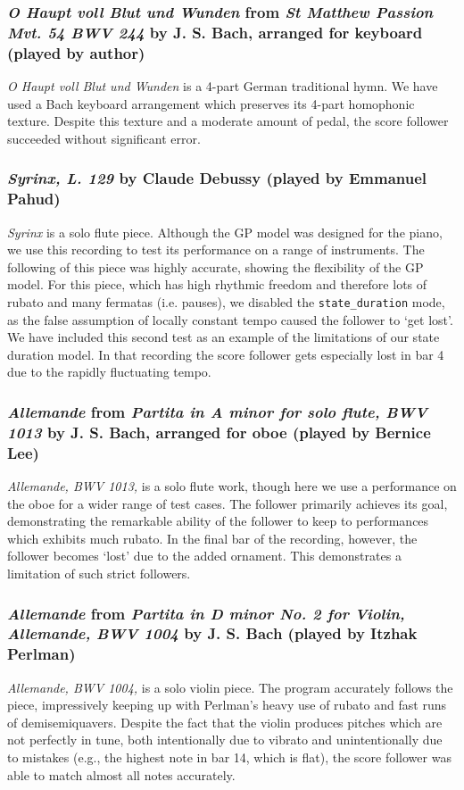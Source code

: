 \subsubsection{\textit{O Haupt voll Blut und Wunden} from \textit{St Matthew Passion Mvt. 54 BWV 244} by J. S. Bach, arranged for keyboard (played by author)}
\textit{O Haupt voll Blut und Wunden} is a 4-part German traditional hymn. We have used a Bach keyboard arrangement which preserves its 4-part \gls{homophonic} \gls{texture}. Despite this texture and a moderate amount of pedal, the score follower succeeded without significant error.

\subsubsection{\textit{Syrinx, L. 129} by Claude Debussy (played by Emmanuel Pahud)}
\textit{Syrinx} is a solo flute piece. Although the GP model was designed for the piano, we use this recording to test its performance on a range of instruments. The following of this piece was highly accurate, showing the flexibility of the GP model. For this piece, which has high \gls{rhythm}ic freedom and therefore lots of rubato and many fermatas (i.e. pauses), we disabled the \verb|state_duration| mode, as the false assumption of locally constant tempo caused the follower to `get lost'. We have included this second test as an example of the limitations of our state duration model. In that recording the score follower gets especially lost in bar 4 due to the rapidly fluctuating tempo.

\subsubsection{\textit{Allemande} from \textit{Partita in A minor for solo flute, BWV 1013} by J. S. Bach, arranged for oboe (played by Bernice Lee)}
\textit{Allemande, BWV 1013,} is a solo flute work, though here we use a performance on the oboe for a wider range of test cases. The follower primarily achieves its goal, demonstrating the remarkable ability of the follower to keep to performances which exhibits much \gls{rubato}. In the final bar of the recording, however, the follower becomes `lost' due to the added \gls{ornament}. This demonstrates a limitation of such strict followers.  

\subsubsection{\textit{Allemande} from \textit{Partita in D minor No. 2 for Violin, Allemande, BWV 1004} by J. S. Bach (played by Itzhak Perlman)}
\textit{Allemande, BWV 1004,} is a solo violin piece. The program accurately follows the piece, impressively keeping up with Perlman's heavy use of rubato and fast runs of \gls{demisemiquavers}. Despite the fact that the violin produces pitches which are not perfectly in tune, both intentionally due to vibrato and unintentionally due to mistakes (e.g., the highest note in bar 14, which is flat), the score follower was able to match almost all notes accurately.      


